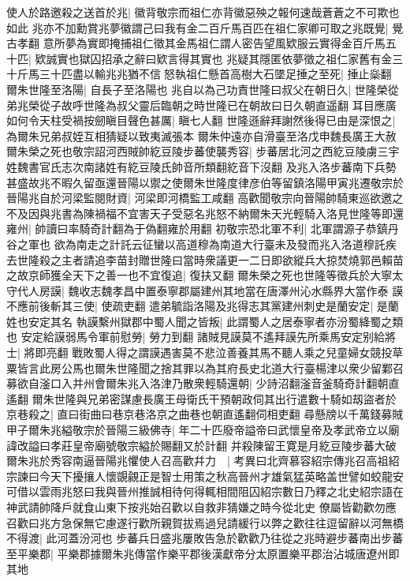 使人於路邀殺之送首於兆|{
	徽背敬宗而祖仁亦背徽惡殃之報何速哉蒼蒼之不可欺也如此}
兆亦不加勳賞兆夢徽謂己曰我有金二百斤馬百匹在祖仁家卿可取之兆既覺|{
	覺古孝翻}
意所夢為實即掩捕祖仁徵其金馬祖仁謂人密告望風欵服云實得金百斤馬五十匹|{
	欵誠實也獄囚招承之辭曰欵言得其實也}
兆疑其隱匿依夢徵之祖仁家舊有金三十斤馬三十匹盡以輸兆兆猶不信怒執祖仁懸首高樹大石墜足捶之至死|{
	捶止橤翻}
爾朱世隆至洛陽|{
	自長子至洛陽也}
兆自以為己功責世隆曰叔父在朝日久|{
	世隆榮從弟兆榮從子故呼世隆為叔父靈后臨朝之時世隆已在朝故曰日久朝直遥翻}
耳目應廣如何令天柱受禍按劒瞋目聲色甚厲|{
	瞋七人翻}
世隆遜辭拜謝然後得已由是深恨之|{
	為爾朱兄弟叔姪互相猜疑以致夷滅張本}
爾朱仲遠亦自滑臺至洛戊申魏長廣王大赦爾朱榮之死也敬宗詔河西賊帥紇豆陵步蕃使襲秀容|{
	步蕃居北河之西紇豆陵虜三宇姓魏書官氏志次南諸姓有紇豆陵氏帥音所類翻紇音下沒翻}
及兆入洛步蕃南下兵勢甚盛故兆不暇久留亟還晉陽以禦之使爾朱世隆度律彦伯等留鎮洛陽甲寅兆遷敬宗於晉陽兆自於河梁監閱財資|{
	河梁即河橋監工咸翻}
高歡聞敬宗向晉陽帥騎東巡欲邀之不及因與兆書為陳禍福不宜害天子受惡名兆怒不納爾朱天光輕騎入洛見世隆等即還雍州|{
	帥讀曰率騎奇計翻為于偽翻雍於用翻}
初敬宗恐北軍不利|{
	北軍謂源子恭鎮丹谷之軍也}
欲為南走之計託云征蠻以高道穆為南道大行臺未及發而兆入洛道穆託疾去世隆殺之主者請追李苗封贈世隆曰當時衆議更一二日即欲縱兵大掠焚燒郭邑賴苗之故京師獲全天下之善一也不宜復追|{
	復扶又翻}
爾朱榮之死也世隆等徵兵於大寧太守代人房謨|{
	魏收志魏孝昌中置泰寧郡屬建州其地當在唐澤州沁水縣界大當作泰}
謨不應前後斬其三使|{
	使疏吏翻}
遣弟毓詣洛陽及兆得志其黨建州刺史是蘭安定|{
	是蘭姓也安定其名}
執謨繫州獄郡中蜀人聞之皆叛|{
	此謂蜀人之居泰寧者亦汾蜀絳蜀之類也}
安定給謨弱馬令軍前慰勞|{
	勞力到翻}
諸賊見謨莫不遙拜謨先所乘馬安定别給將士|{
	將即亮翻}
戰敗蜀人得之謂謨遇害莫不悲泣善養其馬不聽人乘之兒童婦女競投草粟皆言此房公馬也爾朱世隆聞之捨其罪以為其府長史北道大行臺楊津以衆少留鄴召募欲自滏口入并州會爾朱兆入洛津乃散衆輕騎還朝|{
	少詩沼翻滏音釜騎奇計翻朝直遙翻}
爾朱世隆與兄弟密謀慮長廣王母衛氏干預朝政伺其出行遣數十騎如刼盜者於京巷殺之|{
	直曰街曲曰巷京巷洛京之曲巷也朝直遙翻伺相吏翻}
尋懸牓以千萬錢募賊甲子爾朱兆縊敬宗於晉陽三級佛寺|{
	年二十匹廢帝謚帝曰武懷皇帝及孝武帝立以廟諱改謚曰孝莊皇帝廟號敬宗縊於賜翻又於計翻}
并殺陳留王寛是月紇豆陵步蕃大破爾朱兆於秀容南逼晉陽兆懼使人召高歡幷力　|{
	考異曰北齊慕容紹宗傳兆召高祖紹宗諫曰今天下擾攘人懷覬覦正是智士用策之秋高晉州才雄氣猛英略盖世譬如蛟龍安可借以雲雨兆怒曰我與晉州推誠相待何得輒相間阻囚紹宗數日乃釋之北史紹宗語在神武請帥降戶就食山東下按兆始召歡以自救非猜嫌之時今從北史}
僚屬皆勸歡勿應召歡曰兆方急保無它慮遂行歡所親賀拔焉過兒請緩行以弊之歡往往逗留辭以河無橋不得渡|{
	此河蓋汾河也}
步蕃兵日盛兆屢敗告急於歡歡乃往從之兆時避步蕃南出步蕃至平樂郡|{
	平樂郡據爾朱兆傳當作樂平郡後漢獻帝分太原置樂平郡治沾城唐遼州即其地}
